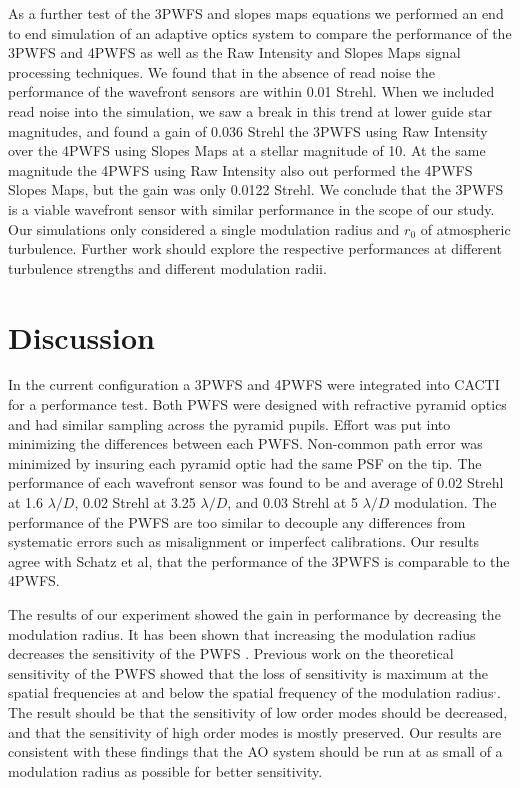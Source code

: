 As a further test of the 3PWFS and slopes maps equations we performed an end to end simulation of an adaptive optics system to compare the performance of the 3PWFS and 4PWFS as well as the Raw Intensity and Slopes Maps signal processing techniques. We found that in the absence of read noise the performance of the wavefront sensors are within 0.01 Strehl. When we included read noise into the simulation, we saw a break in this trend at lower guide star magnitudes, and found a gain of 0.036 Strehl the 3PWFS using Raw Intensity  over the 4PWFS using Slopes Maps at a stellar magnitude of 10. At the same magnitude the 4PWFS using Raw Intensity also out performed the 4PWFS Slopes Maps, but the gain was only 0.0122 Strehl. We conclude that the 3PWFS is a viable wavefront sensor with similar performance in the scope of our study. Our simulations only considered a single modulation radius and $r_0$ of atmospheric turbulence. Further work should explore the respective performances at different turbulence strengths and different modulation radii. 

\section{Discussion}

In the current configuration a 3PWFS and 4PWFS were integrated into CACTI for a performance test. Both PWFS were designed with refractive pyramid optics and had similar sampling across the pyramid pupils. Effort was put into minimizing the differences between each PWFS. Non-common path error was minimized by insuring each pyramid optic had the same PSF on the tip. The performance of each wavefront sensor was found to be and average of 0.02 Strehl at 1.6 $\lambda/D$, 0.02 Strehl at 3.25 $\lambda/D$, and 0.03 Strehl at 5 $\lambda/D$ modulation. The performance of the PWFS are too similar to decouple any differences from systematic errors such as misalignment or imperfect calibrations. Our results agree with Schatz et al, that the performance of the 3PWFS is comparable to the 4PWFS. 

The results of our experiment showed the gain in performance by decreasing the modulation radius. It has been shown that increasing the modulation radius decreases the sensitivity of the PWFS \cite{correia2020performance}. Previous work on the theoretical sensitivity of the PWFS showed that the loss of sensitivity is maximum at the spatial frequencies at and below the spatial frequency of the modulation radius\cite{guyon2005}$^,$\cite{verinaud2004nature}. The result should be that the sensitivity of low order modes should be decreased, and that the sensitivity of high order modes is mostly preserved. Our results are consistent with these findings that the AO system should be run at as small of a modulation radius as possible for better sensitivity. 



